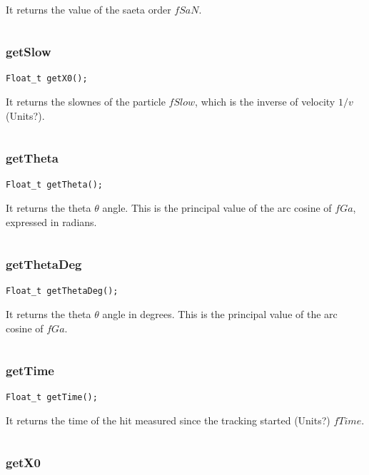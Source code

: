 \documentclass[a4paper]{book}
\begin{document}
It returns the value of the saeta order $fSaN$.

\[\]

\subsubsection{getSlow}

\begin{lstlisting}
Float_t getX0();
\end{lstlisting}

It returns the slownes of the particle $fSlow$, which is the inverse of velocity $1/v$ (Units?).

\[\]

\subsubsection{getTheta}

\begin{lstlisting}
Float_t getTheta();
\end{lstlisting}

It returns the theta $\theta$ angle. This is the principal value of the arc cosine of $fGa$, expressed in radians.

\[\]

\subsubsection{getThetaDeg}

\begin{lstlisting}
Float_t getThetaDeg();
\end{lstlisting}

It returns the theta $\theta$ angle in degrees. This is the principal value of the arc cosine of $fGa$.

\[\]

\subsubsection{getTime}

\begin{lstlisting}
Float_t getTime();
\end{lstlisting}

It returns the time of the hit measured since the tracking started (Units?) $fTime$.

\[\]


\subsubsection{getX0}
\end{document}
